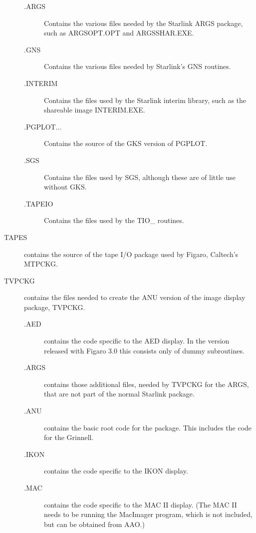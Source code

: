 \begin{description}
\begin{description}

\item [.ARGS] Contains the various files needed by the Starlink ARGS 
package, such as ARGS\-OPT\-.OPT and ARGSSHAR.EXE.

\item [.GNS] Contains the various files needed by Starlink's GNS
routines.

\item [.INTERIM] Contains the files used by the Starlink interim library, 
such as the shareable image INTERIM.EXE.

\item [.PGPLOT...] Contains the source of the GKS version of PGPLOT.

\item [.SGS] Contains the files used by SGS, although these are of little
use without GKS.

\item [.TAPEIO] Contains the files used by the TIO\_ routines.

\end {description}

\item [TAPES] contains the source of the tape I/O package used by Figaro,
Caltech's MTPCKG.

\item [TVPCKG] contains the files needed to create the ANU version of the
image display package, TVPCKG.

\begin{description}

\item [.AED] contains the code specific to the AED display. In the 
version released with Figaro 3.0 this consists only of dummy subroutines.

\item [.ARGS] contains those additional files, needed by TVPCKG for the ARGS,
that are not part of the normal Starlink package.

\item [.ANU] contains the basic root code for the package. This
includes the code for the Grinnell.

\item [.IKON] contains the code specific to the IKON display.

\item [.MAC] contains the code specific to the MAC II display. (The MAC 
II needs to be running the MacImager program, which is not included, but
can be obtained from AAO.)


\end{description}
\end{description}
